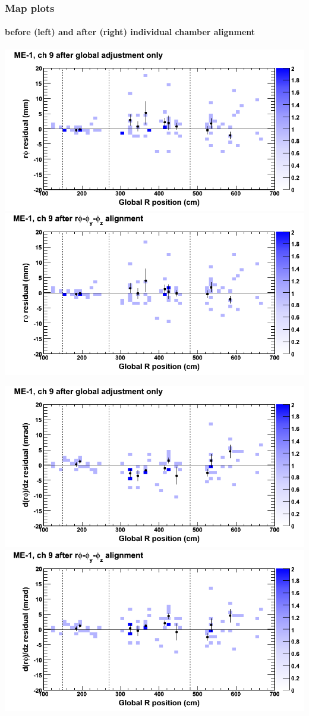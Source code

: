 \documentclass[compress]{beamer}
\begin{document}
\begin{frame}
\frametitle{Map plots}
\framesubtitle{before (left) and after (right) individual chamber alignment}
\includegraphics[width=0.5\linewidth]{ringmapplots_3dof/before_CSCvsr_mem1ch09_x.png} \includegraphics[width=0.5\linewidth]{ringmapplots_3dof/after_CSCvsr_mem1ch09_x.png}

\includegraphics[width=0.5\linewidth]{ringmapplots_3dof/before_CSCvsr_mem1ch09_dxdz.png} \includegraphics[width=0.5\linewidth]{ringmapplots_3dof/after_CSCvsr_mem1ch09_dxdz.png}
\end{frame}
\end{document}
